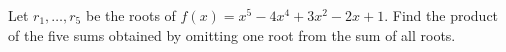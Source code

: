 Let $r_1,\ldots,r_5$ be the roots of $f(x)=x^5-4x^4+3x^2-2x+1$. Find the product of the five sums obtained by omitting one root from the sum of all roots.
